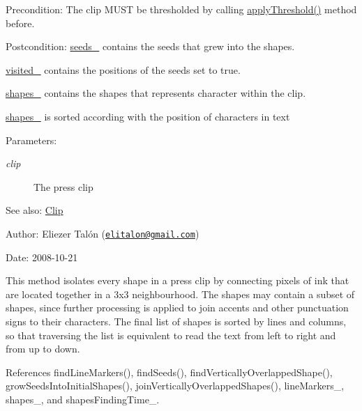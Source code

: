 \begin{Desc}
\item[Precondition:]The clip MUST be thresholded by calling \hyperlink{class_segmenter_6854315e3320f9d9a8ece14cbb8570ee}{applyThreshold()} method before.\end{Desc}
\begin{Desc}
\item[Postcondition:]\hyperlink{class_segmenter_7859d050250b9fdf7c96374f80008d6e}{seeds\_\-} contains the seeds that grew into the shapes. 

\hyperlink{class_segmenter_fe4dd18749f268aae2b26a1abff6a607}{visited\_\-} contains the positions of the seeds set to true. 

\hyperlink{class_segmenter_41b94ede2829063e0937dc150756e77e}{shapes\_\-} contains the shapes that represents character within the clip. 

\hyperlink{class_segmenter_41b94ede2829063e0937dc150756e77e}{shapes\_\-} is sorted according with the position of characters in text\end{Desc}
\begin{Desc}
\item[Parameters:]
\begin{description}
\item[{\em clip}]The press clip\end{description}
\end{Desc}
\begin{Desc}
\item[See also:]\hyperlink{class_clip}{Clip}\end{Desc}
\begin{Desc}
\item[Author:]Eliezer Talón (\href{mailto:elitalon@gmail.com}{\tt elitalon@gmail.com}) \end{Desc}
\begin{Desc}
\item[Date:]2008-10-21\end{Desc}
This method isolates every shape in a press clip by connecting pixels of ink that are located together in a 3x3 neighbourhood. The shapes may contain a subset of shapes, since further processing is applied to join accents and other punctuation signs to their characters. The final list of shapes is sorted by lines and columns, so that traversing the list is equivalent to read the text from left to right and from up to down. 

References findLineMarkers(), findSeeds(), findVerticallyOverlappedShape(), growSeedsIntoInitialShapes(), joinVerticallyOverlappedShapes(), lineMarkers\_\-, shapes\_\-, and shapesFindingTime\_\-.

